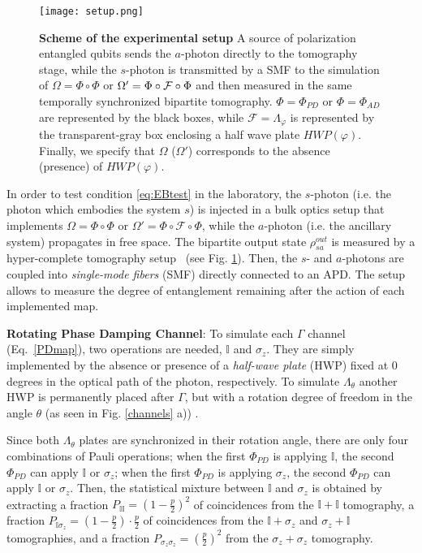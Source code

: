 \documentclass[aps,twocolumn,pra,superscriptaddress,showpacs,showkeys,floatfix]{revtex4-1}
\begin{document}
\begin{figure}[h]
	\centering
		\texttt{[image: setup.png]}
	\caption{\textbf{Scheme of the experimental setup} A source of polarization entangled qubits sends the $a$-photon directly to the tomography stage, while the $s$-photon is transmitted by a SMF to the simulation of $\Omega=\Phi \circ \Phi$ or $\Omega'=\Phi \circ {\cal F} \circ\Phi$ and then measured in the same temporally synchronized bipartite tomography. $\Phi=\Phi_{PD}$ or $\Phi=\Phi_{AD}$ are represented by the black boxes, while $\mathcal{F}=\Lambda_\varphi$ is represented by the transparent-gray box enclosing a half wave plate $HWP(\varphi)$.  Finally, we specify that $\Omega$ ($\Omega'$)  corresponds to  the absence (presence) of $HWP(\varphi)$.}
	\label{setup}
\end{figure}

In order to test condition \eqref{eq:EBtest} in the laboratory, the $s$-photon (i.e. the photon which embodies the system $s$) is injected in a bulk optics setup that implements $\Omega=\Phi\circ\Phi$ or $\Omega'=\Phi\circ\mathcal{F}\circ\Phi$, while the $a$-photon (i.e. the ancillary system) propagates in free space. The bipartite output state $\rho_{sa}^{out}$ is measured by a hyper-complete tomography setup~\cite{tomography} (see Fig. \ref{setup}). Then,  the  $s$- and $a$-photons are coupled into \textit{single-mode fibers} (SMF) directly connected to an APD. The setup allows to measure the degree of entanglement remaining after the action of each implemented map.


\textbf{Rotating Phase Damping Channel}: To simulate each $\Gamma$ channel (Eq.~\eqref{PDmap}), two operations are needed, $\mathbb{I}$ and $\sigma_{z}$.  They are simply implemented by the absence or presence of a \textit{half-wave plate} (HWP) fixed at $0$ degrees in the optical path of the photon, respectively. To simulate $\Lambda_\theta$ another HWP is permanently placed after $\Gamma$, but with a rotation degree of freedom in the angle  $\theta$  (as seen in Fig. \ref{channels} a)) \cite{channelcapacity,pauli_channel}.

Since both $\Lambda_\theta$ plates are synchronized in their rotation angle, there are only four combinations of Pauli operations; when the first $\Phi_{PD}$ is applying $\mathbb{I}$, the second $\Phi_{PD}$ can apply $\mathbb{I}$ or $\sigma_z$; when the first $\Phi_{PD}$ is applying $\sigma_z$, the second $\Phi_{PD}$ can apply $\mathbb{I}$ or $\sigma_z$. Then, the statistical mixture between $\mathbb{I}$ and $\sigma_{z}$ is obtained by extracting a fraction $P_{\mathbb{I}\mathbb{I}}=(1-\frac{p}{2})^{2}$ of coincidences from the $\mathbb{I}+\mathbb{I}$ tomography, a fraction $P_{\mathbb{I}\sigma_{z}}=(1-\frac{p}{2})\cdot\frac{p}{2}$ of coincidences from the $\mathbb{I}+\sigma_{z}$ and $\sigma_{z}+\mathbb{I}$ tomographies, and a fraction $P_{\sigma_{z}\sigma_{z}}=(\frac{p}{2})^{2}$ from the $\sigma_{z}+\sigma_{z}$ tomography.
\end{document}
